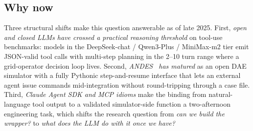 \documentclass[journal,twocolumn,10pt]{IEEEtran}
\begin{document}
\subsection{Why now}
Three structural shifts make this question answerable as of late 2025. First, \emph{open and closed LLMs have crossed a practical reasoning threshold} on tool-use benchmarks: models in the DeepSeek-chat / Qwen3-Plus / MiniMax-m2 tier emit JSON-valid tool calls with multi-step planning in the 2--10 turn range where a grid-operator decision loop lives. Second, \emph{ANDES~\cite{andes} has matured} as an open DAE simulator with a fully Pythonic step-and-resume interface that lets an external agent issue commands mid-integration without round-tripping through a case file. Third, \emph{Claude Agent SDK and MCP idioms} make the binding from natural-language tool output to a validated simulator-side function a two-afternoon engineering task, which shifts the research question from \emph{can we build the wrapper?} to \emph{what does the LLM do with it once we have?}
\end{document}
